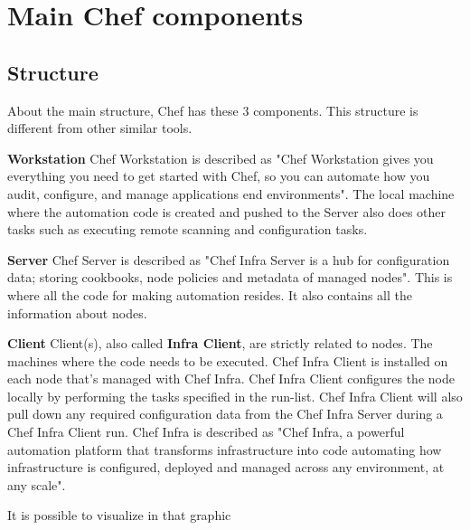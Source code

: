 \documentclass[12pt,a4paper,openright,twoside]{book}
\begin{document}
\section{Main Chef components}

\subsection{Structure}
About the main structure, Chef has these 3 components.
This structure is different from other similar tools.

\textbf{Workstation}\newline
Chef Workstation is described as\cite{chefWorkstation}
"Chef Workstation gives you everything you need to get started with Chef, so you can automate how you audit, configure, and manage applications end environments".
The local machine where the automation code is created and pushed to the Server also does other tasks such as executing remote scanning and configuration tasks.


\textbf{Server}\newline
Chef Server is described as\cite{chefServer}
"Chef Infra Server is a hub for configuration data; storing cookbooks, node policies and metadata of managed nodes".
This is where all the code for making automation resides. It also contains all the information about nodes.


\textbf{Client}\newline
Client(s), also called \textbf{Infra Client}, are strictly related to nodes. The machines where the code needs to be executed.
Chef Infra Client is installed on each node that's managed with Chef Infra. Chef Infra Client configures the node locally by performing the tasks specified in the run-list.
Chef Infra Client will also pull down any required configuration data from the Chef Infra Server during a Chef Infra Client run.
Chef Infra is described as\cite{chefInfra}
"Chef Infra, a powerful automation platform that transforms infrastructure into code automating how infrastructure is configured, deployed and managed across any environment, at any scale".
\newline

It is possible to visualize in that graphic \cite{chefFreeCodeCamp}
\newline
\end{document}
